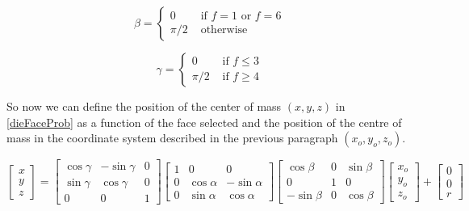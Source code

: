 \documentclass[english,12pt,a4paper,final]{article}
\begin{document}
\begin{equation*}
	\beta = \begin{cases} 
		0 & \text{ if } f = 1 \text{ or } f = 6 \\
		\pi/2 & \text{ otherwise }
	\end{cases}
\end{equation*}

\begin{equation*}
	\gamma = \begin{cases} 
		0 & \text{ if } f \le 3 \\
		\pi/2 & \text{ if } f \ge 4
	\end{cases}
\end{equation*}	

So now we can define the position of the center of mass $(x, y, z)$ in \eqref{dieFaceProb} as a function of the face selected and the position of the centre of mass in the coordinate system described in the previous paragraph $(x_o, y_o, z_o)$.

\begin{equation*}
	\begin{bmatrix}
		x \\ y \\ z
	\end{bmatrix}
	=
	\begin{bmatrix}
		\cos\gamma & -\sin\gamma & 0 \\
		\sin\gamma & \cos\gamma & 0 \\
		0 & 0 & 1
	\end{bmatrix}
	\begin{bmatrix}
		1 & 0 & 0 \\
		0 & \cos\alpha & -\sin\alpha \\
		0 & \sin\alpha & \cos\alpha
	\end{bmatrix}
	\begin{bmatrix}
		\cos\beta & 0 & \sin\beta \\
		0 & 1 & 0 \\
		-\sin\beta & 0 & \cos\beta
	\end{bmatrix}
	\begin{bmatrix}
		x_o \\ y_o \\ z_o
	\end{bmatrix}
	 +
	 \begin{bmatrix}
	 	0 \\ 0 \\ r
	 \end{bmatrix}
\end{equation*}
\end{document}
